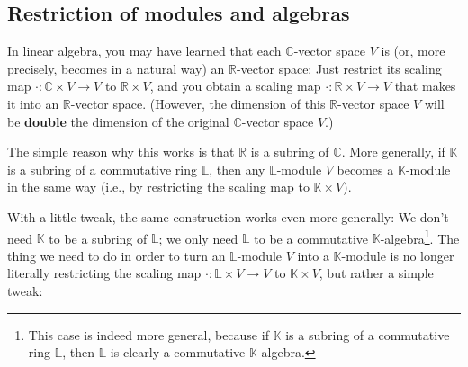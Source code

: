 \documentclass[numbers=enddot,12pt,final,onecolumn,notitlepage]{scrartcl}%
\theoremstyle{definition}
\begin{document}
\subsection{Restriction of modules and algebras}

In linear algebra, you may have learned that each $\mathbb{C}$-vector space
$V$ is (or, more precisely, becomes in a natural way) an $\mathbb{R}$-vector
space: Just restrict its scaling map $\cdot:\mathbb{C}\times V\rightarrow V$
to $\mathbb{R}\times V$, and you obtain a scaling map $\cdot:\mathbb{R}\times
V\rightarrow V$ that makes it into an $\mathbb{R}$-vector space. (However, the
dimension of this $\mathbb{R}$-vector space $V$ will be \textbf{double} the
dimension of the original $\mathbb{C}$-vector space $V$.)

The simple reason why this works is that $\mathbb{R}$ is a subring of
$\mathbb{C}$. More generally, if $\mathbb{K}$ is a subring of a commutative
ring $\mathbb{L}$, then any $\mathbb{L}$-module $V$ becomes a $\mathbb{K}%
$-module in the same way (i.e., by restricting the scaling map to
$\mathbb{K}\times V$).

With a little tweak, the same construction works even more generally: We don't
need $\mathbb{K}$ to be a subring of $\mathbb{L}$; we only need $\mathbb{L}$
to be a commutative $\mathbb{K}$-algebra\footnote{This case is indeed more
general, because if $\mathbb{K}$ is a subring of a commutative ring
$\mathbb{L}$, then $\mathbb{L}$ is clearly a commutative $\mathbb{K}%
$-algebra.}. The thing we need to do in order to turn an $\mathbb{L}$-module
$V$ into a $\mathbb{K}$-module is no longer literally restricting the scaling
map $\cdot:\mathbb{L}\times V\rightarrow V$ to $\mathbb{K}\times V$, but
rather a simple tweak:
\end{document}
